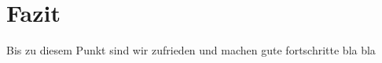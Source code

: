 \section{Fazit}
Bis zu diesem Punkt sind wir zufrieden und machen gute fortschritte bla bla
\subsection{}